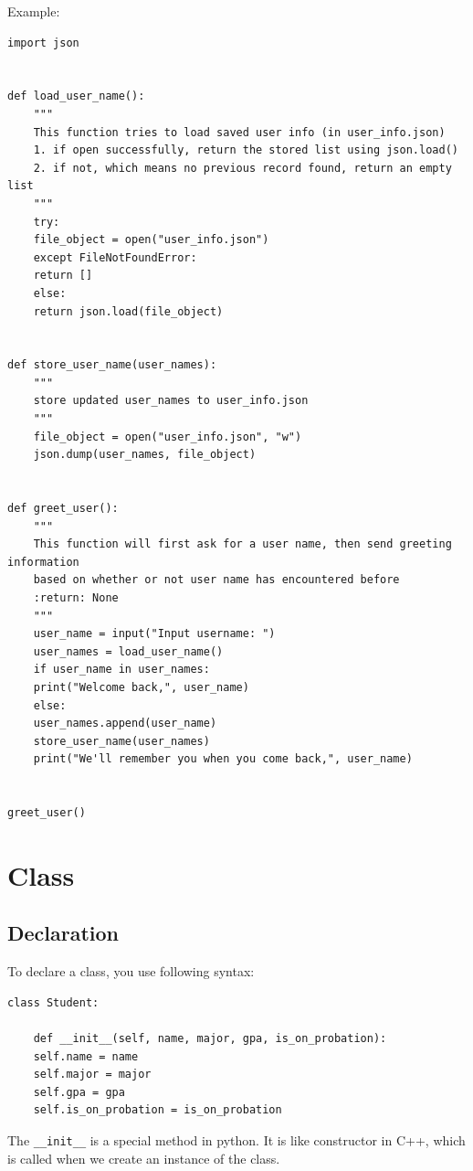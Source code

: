 \documentclass[12pt]{book}
\begin{document}
Example:
\begin{verbatim}
import json


def load_user_name():
    """
    This function tries to load saved user info (in user_info.json)
    1. if open successfully, return the stored list using json.load()
    2. if not, which means no previous record found, return an empty list
    """
    try:
	file_object = open("user_info.json")
    except FileNotFoundError:
	return []
    else:
	return json.load(file_object)


def store_user_name(user_names):
    """
    store updated user_names to user_info.json
    """
    file_object = open("user_info.json", "w")
    json.dump(user_names, file_object)


def greet_user():
    """
    This function will first ask for a user name, then send greeting information
    based on whether or not user name has encountered before
    :return: None
    """
    user_name = input("Input username: ")
    user_names = load_user_name()
    if user_name in user_names:
	print("Welcome back,", user_name)
    else:
	user_names.append(user_name)
	store_user_name(user_names)
	print("We'll remember you when you come back,", user_name)


greet_user()

\end{verbatim}
\chapter{Class}
\label{sec:orgaaa6aa5}
\section{Declaration}
\label{sec:orgedf34e4}
To declare a class, you use following syntax:
\begin{verbatim}
class Student:

    def __init__(self, name, major, gpa, is_on_probation):
	self.name = name
	self.major = major
	self.gpa = gpa
	self.is_on_probation = is_on_probation
\end{verbatim}
The \texttt{\_\_init\_\_} is a special method in python. It is like constructor in C++, which is called when we create an instance of the class.
\end{document}
